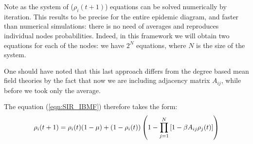 \documentclass[../main/main.tex]{subfiles}
\begin{document}

Note as the system of (\( \rho _i (t+1) \)) equations can be solved numerically by iteration. This results to be precise for the entire epidemic diagram, and faster than numerical simulations: there is no need of averages and reproduces individual nodes probabilities. Indeed, in this framework we will obtain two equations for each of the nodes: we have \( 2^N \) equations, where \( N \) is the size of the system.

\begin{remark}
One should have noted that this last approach differs from the degree based mean field theories by the fact that now we are including adjacency matrix \( A_{ij} \), while before we took only the average.
\end{remark}
The equation (\ref{eqn:SIR_IBMF}) therefore takes the form:
\begin{equation}
      \rho _i (t+1) = \rho _i(t) (1- \mu ) + (1 - \rho _i(t))\left(1 - \prod_{j=1}^{N} \qty[1- \beta A_{ij} \rho _j (t)]\right)
  \label{eqn:SIR_IBMF}
\end{equation}
\end{document}

